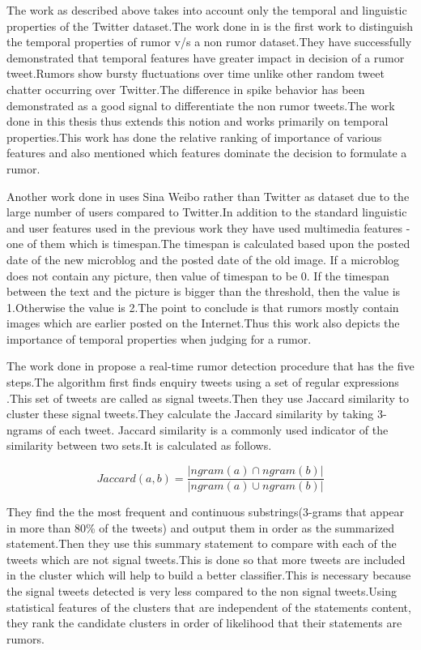 \par
The work as described above takes into account only the temporal and linguistic properties of the Twitter dataset.The work done in \cite{kwon2013prominent} is the first work to distinguish the temporal properties of rumor v/s a non rumor dataset.They have successfully demonstrated that temporal features have greater impact in decision of a rumor tweet.Rumors show bursty fluctuations over time unlike other random tweet chatter occurring over Twitter.The difference in spike behavior has been demonstrated as a good signal to differentiate the non rumor tweets.The work done in this thesis thus extends this notion and works primarily on temporal properties.This work has done the relative ranking of importance of various features and also mentioned which features dominate the decision to formulate a rumor. 
\\
\par
Another work done in \cite{sun2013detecting} uses Sina Weibo rather than Twitter as dataset due to the large number of users compared to Twitter.In addition to the standard linguistic and user features used in the previous work they have used multimedia features - one of them which is timespan.The timespan is calculated based upon the posted date of the new microblog and the posted date of the old image. If a microblog does not contain any picture, then value of timespan to be 0. If the timespan between the text and the picture is bigger than the threshold, then the value is 1.Otherwise the value is 2.The point to conclude is that rumors mostly contain images which are earlier posted on the Internet.Thus this work also depicts the importance of temporal properties when judging for a rumor.
\\
\par
The work done in \cite{zhao2015enquiring} propose a real-time rumor detection procedure that has the five steps.The algorithm first finds enquiry tweets using a set of regular expressions .This set of tweets are called as signal tweets.Then they use Jaccard similarity to cluster these signal tweets.They calculate the Jaccard similarity by taking 3-ngrams of each tweet. Jaccard similarity is a commonly used indicator of the similarity between two sets.It is calculated as follows.

\begin{equation}
Jaccard(a,b)= \frac{|ngram(a) \cap ngram(b)|}{|ngram(a) \cup ngram(b)|}
\end{equation}

They find the the most frequent and continuous substrings(3-grams that appear in
more than 80\% of the tweets) and output them in order as the summarized statement.Then they use this summary statement to compare with each of the tweets which are not signal tweets.This is done so that more tweets are included in the cluster which will help to build a better classifier.This is necessary because the signal tweets detected is very less compared to the non signal tweets.Using statistical features of the clusters that are independent of the statements content, they rank the candidate clusters in order of likelihood that their statements are rumors.\\
\par

